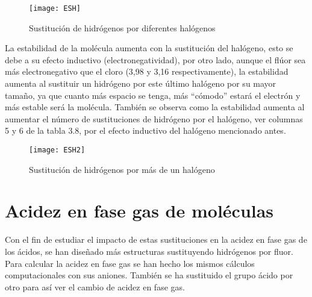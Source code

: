 \begin{figure}[H]
	\centering
	\texttt{[image: ESH]}
	\caption{Sustitución de hidrógenos por diferentes halógenos}
\end{figure}


La estabilidad de la molécula aumenta con la sustitución del halógeno, esto se debe a su efecto inductivo (electronegatividad), por otro lado, aunque el flúor sea más electronegativo que el cloro (3,98 y 3,16 respectivamente), la estabilidad aumenta al sustituir un hidrógeno por este último halógeno por su mayor tamaño, ya que cuanto más espacio se tenga, más ``cómodo'' estará el electrón y más estable será la molécula.
También se observa como la estabilidad aumenta al aumentar el número de sustituciones de hidrógeno por el halógeno, ver columnas 5 y 6 de la tabla 3.8, por el efecto inductivo del halógeno mencionado antes.



\begin{figure}[h]
	\centering
	\texttt{[image: ESH2]}
	\caption{Sustitución de hidrógenos por más de un halógeno }
\end{figure}

\section{Acidez en fase gas de moléculas}

Con el fin de estudiar el impacto de estas sustituciones en la acidez en fase gas de los ácidos, se han diseñado más estructuras sustituyendo hidrógenos por fluor. Para calcular la acidez en fase gas se han hecho los mismos cálculos computacionales con sus aniones.
También se ha sustituido el grupo ácido por otro para así ver el cambio de acidez en fase gas.

